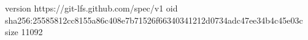 version https://git-lfs.github.com/spec/v1
oid sha256:25585812cc8155a86c408e7b71526f66340341212d0734adc47ee34b4c45e03c
size 11092
